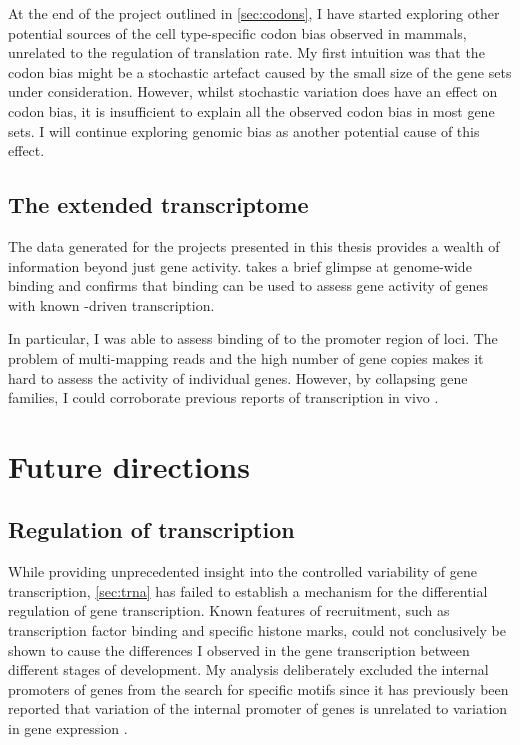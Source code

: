 At the end of the project outlined in \cref{sec:codons}, I have started
exploring other potential sources of the cell type-specific codon bias observed
in mammals, unrelated to the regulation of translation rate. My first intuition
was that the codon bias might be a stochastic artefact caused by the small size
of the gene sets under consideration. However, whilst stochastic variation does
have an effect on codon bias, it is insufficient to explain all the observed
codon bias in most gene sets. I will continue exploring genomic \gc bias as
another potential cause of this effect.

\subsection{The extended  transcriptome}

The  \chipseq data generated for the projects presented in this thesis
provides a wealth of information beyond just \trna gene activity.
 takes a brief glimpse at genome-wide  binding and confirms
that  binding can be used to assess gene activity of genes with known
-driven transcription.

In particular, I was able to assess binding of  to the promoter region of
\transsine loci. The problem of multi-mapping reads and the high number of
\transsine gene copies makes it hard to assess the activity of individual
\transsine genes. However, by collapsing \transsine gene families, I could
corroborate previous reports of \transsine transcription in vivo
\citep{Carriere:2012}.

\section{Future directions}

\subsection{Regulation of  transcription}

While providing unprecedented insight into the controlled variability of \trna
gene transcription, \cref{sec:trna} has failed to establish a mechanism for the
differential regulation of \trna gene transcription. Known features of 
recruitment, such as transcription factor binding and specific histone marks,
could not conclusively be shown to cause the differences I observed in the \trna
gene transcription between different stages of development. My analysis
deliberately excluded the internal promoters of \trna genes from the search for
specific motifs since it has previously been reported that variation of the
internal promoter of \trna genes is unrelated to variation in gene expression
\citep{Oler:2010,Canella:2012}.

